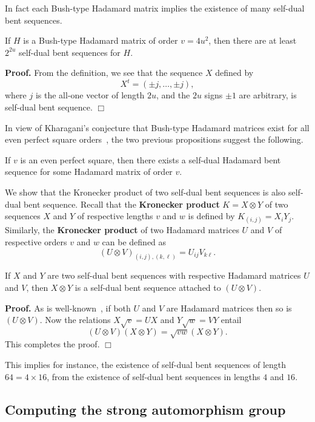 \documentclass[12pt]{article}
\newenvironment{pf}{\noindent\textbf{Proof.}\quad}{\hfill{$\Box$}}
\begin{document}
In fact each Bush-type Hadamard matrix implies the existence of many self-dual bent sequences.

{\prop If $H$ is a Bush-type  Hadamard matrix of order $v=4u^2$, then there are at least $2^{2u}$ self-dual bent sequences for $H$.}

\begin{pf}
 From the definition, we see that the sequence $X$ defined by  $$X^t=(\pm j,\dots,\pm j), $$  where $j$ is the all-one vector of length ${2u}$, and the $2u$ signs $\pm1$ are arbitrary, is self-dual bent sequence.
\end{pf}


In view of Kharagani's conjecture that Bush-type Hadamard matrices exist for all even perfect square orders~\cite{Kharaghani:2000:twin}, the two previous propositions suggest the following.

{\conj \label{conjecture} If $v$ is an even perfect square, then there exists a self-dual Hadamard bent sequence for some Hadamard matrix of order $v$.}

We show that the Kronecker product of two self-dual bent sequences is also self-dual bent sequence. Recall that the {\bf Kronecker product} $K=X \otimes Y$ of two sequences $X$ and $Y$
of respective lengths $v$ and $w$ is defined by $K_{(i,j)}=X_iY_j$. Similarly, the {\bf Kronecker product} of two Hadamard matrices $U$ and $V$ of respective orders $v$ and $w$ can be defined as
$$(U \otimes V)_{(i,j),(k,\ell)}=U_{ij}V_{k\ell}. $$

{\prop If $X$ and  $Y$ are two self-dual bent sequences with respective Hadamard matrices $U$ and $V$, then $X \otimes Y$ is a self-dual bent sequence attached to $(U \otimes V)$.}

\begin{pf}
 As is well-known~\cite{WSW:72}, if both $U$ and $V$ are Hadamard matrices then so is $(U \otimes V)$. Now the relations $X \sqrt{v}=U X$ and $Y \sqrt{w}=V Y$ entail
 $$(U \otimes V)(X \otimes Y)=\sqrt{v w}(X \otimes Y). $$
 This completes the proof.
\end{pf}

This implies for instance, the existence of self-dual bent sequences of length $64=4 \times 16$, from the existence of self-dual bent sequences in lengths $4$ and $16$.

\subsection{Computing the strong automorphism group}
\end{document}

